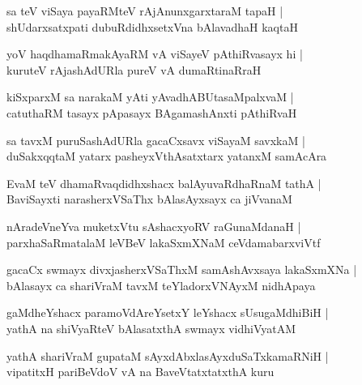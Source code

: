 \begin{shloka}
sa teV viSaya payaRMteV rAjAnunxgarxtaraM tapaH |\\
shUdarxsatxpati dubuRdidhxsetxVna bAlavadhaH kaqtaH 
\end{shloka}

\begin{shloka}
yoV haqdhamaRmakAyaRM vA viSayeV pAthiRvasayx hi |\\
kuruteV rAjashAdURla pureV vA dumaRtinaRraH 
\end{shloka}

\begin{shloka}
kiSxparxM sa narakaM yAti yAvadhABUtasaMpalxvaM |\\
catuthaRM tasayx pApasayx BAgamashAnxti pAthiRvaH
\end{shloka}

\begin{shloka}
sa tavxM puruSashAdURla gacaCxsavx viSayaM savxkaM |\\
duSakxqqtaM yatarx pasheyxVthAsatxtarx yatanxM samAcAra
\end{shloka}

\begin{shloka}
EvaM teV dhamaRvaqdidhxshacx balAyuvaRdhaRnaM tathA |\\
BaviSayxti narasherxVSaThx bAlasAyxsayx ca jiVvanaM 
\end{shloka}

\begin{shloka}
nAradeVneYva muketxVtu sAshacxyoRV raGunaMdanaH |\\
parxhaSaRmatalaM leVBeV lakaSxmXNaM ceVdamabarxviVtf 
\end{shloka}

\begin{shloka}
gacaCx swmayx divxjasherxVSaThxM samAshAvxsaya lakaSxmXNa |\\
bAlasayx ca shariVraM tavxM teYladorxVNAyxM nidhApaya
\end{shloka}

\begin{shloka}
gaMdheYshacx paramoVdAreYsetxY leYshacx sUsugaMdhiBiH |\\
yathA na shiVyaRteV bAlasatxthA swmayx vidhiVyatAM 
\end{shloka}

\begin{shloka}
yathA shariVraM gupataM sAyxdAbxlasAyxduSaTxkamaRNiH |\\
vipatitxH pariBeVdoV vA na BaveVtatxtatxthA kuru
\end{shloka}

